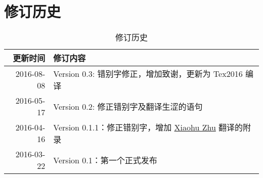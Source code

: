 
\chapter{修订历史}

\begin{table}[h]
  \centering
  \begin{tabularx}{0.9\textwidth}{ r X }
    \toprule
    \textbf{更新时间} & \textbf{修订内容}\\
    \midrule
    2016-08-08 & Version 0.3: 错别字修正，增加致谢，更新为 Tex2016 编译 \\
    \midrule
    2016-05-17 & Version 0.2: 修正错别字及翻译生涩的语句 \\
    \midrule
    2016-04-16 & Version 0.1.1：修正错别字，增加 \href{mailto:xhzhu.nju@gmail}{Xiaohu Zhu} 翻译的附录\\
    \midrule
    2016-03-22 & Version 0.1：第一个正式发布\\
    \bottomrule
  \end{tabularx}
  \caption{修订历史}
  \label{table:DocumentChanges}
\end{table}
